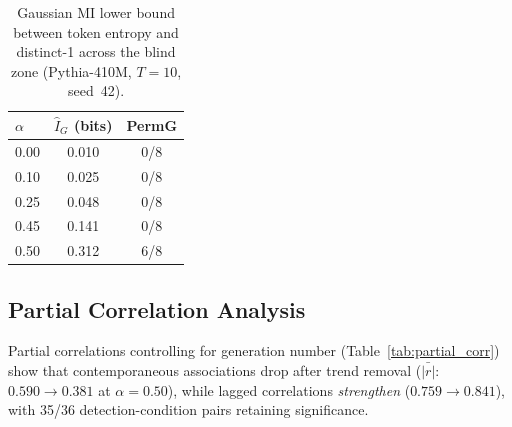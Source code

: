 \begin{table}[H]
\centering
\small
\caption{Gaussian MI lower bound between token entropy and distinct-1 across the blind zone (Pythia-410M, $T{=}10$, seed~42).}
\label{tab:mi_blind}
\begin{tabular}{lcc}
\toprule
$\alpha$ & $\hat{I}_G$ (bits) & PermG \\
\midrule
0.00 & 0.010 & 0/8 \\
0.10 & 0.025 & 0/8 \\
0.25 & 0.048 & 0/8 \\
0.45 & 0.141 & 0/8 \\
0.50 & 0.312 & 6/8 \\
\bottomrule
\end{tabular}
\end{table}

\subsection{Partial Correlation Analysis}
\label{app:partial_corr}

\begin{table}[H]
\centering
\small
\caption{Partial correlation controlling for generation. Lagged partial $|r|$ increases after trend removal, confirming genuine temporal precedence.}
\label{tab:partial_corr}
\end{table}

Partial correlations controlling for generation number (Table~\ref{tab:partial_corr}) show that contemporaneous associations drop after trend removal ($\bar{|r|}$: $0.590{\to}0.381$ at $\alpha{=}0.50$), while lagged correlations \emph{strengthen} ($0.759{\to}0.841$), with 35/36 detection-condition pairs retaining significance.

